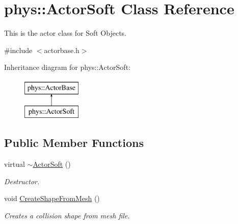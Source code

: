 \hypertarget{classphys_1_1ActorSoft}{
\section{phys::ActorSoft Class Reference}
\label{d4/d23/classphys_1_1ActorSoft}
}


This is the actor class for Soft Objects.  




{\ttfamily \#include $<$actorbase.h$>$}

Inheritance diagram for phys::ActorSoft:\begin{figure}[H]
\begin{center}
\leavevmode
\includegraphics[height=2cm]{d4/d23/classphys_1_1ActorSoft}
\end{center}
\end{figure}
\subsection*{Public Member Functions}
\begin{DoxyCompactItemize}
\item 
virtual \hyperlink{classphys_1_1ActorSoft_a636c145f1e468fd45adc8da2a1708fbe}{$\sim$ActorSoft} ()
\begin{DoxyCompactList}\small\item\em Destructor. \item\end{DoxyCompactList}\item 
void \hyperlink{classphys_1_1ActorSoft_a51d78e0f503c3c815511c3d246b426ae}{CreateShapeFromMesh} ()
\begin{DoxyCompactList}\small\item\em Creates a collision shape from mesh file. \item\end{DoxyCompactList}\end{DoxyCompactItemize}
